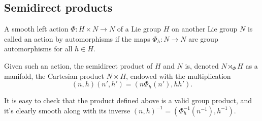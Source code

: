






\subsection{Semidirect products}

\begin{defn}
    A smooth left action $\Phi:H\times N\to N$ of a Lie group $H$ on another Lie group $N$ is called an action by automorphisms if the maps $\Phi_h:N\to N$ are group automorphisms for all $h\in H$. 

    Given such an action, the semidirect product of $H$ and $N$ is, denoted $N\rtimes_\Phi H$ as a manifold, the Cartesian product $N\times H$, endowed with the multiplication
    \[(n,h)(n',h')=(n\Phi_h(n'),hh').\]
\end{defn}
It is easy to check that the product defined above is a valid group product, and it's clearly smooth along with its inverse $(n,h)^{-1}=(\Phi_h^{-1}(n^{-1}),h^{-1})$.

